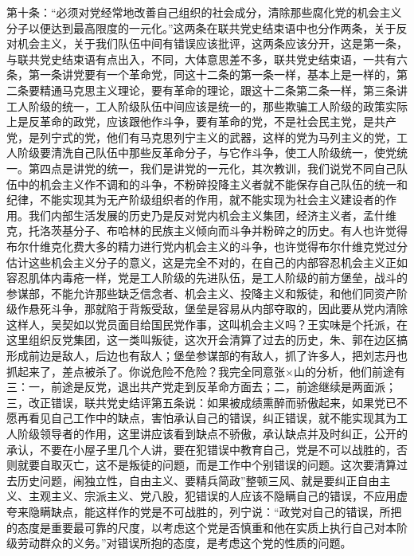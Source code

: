 第十条：“必须对党经常地改善自己组织的社会成分，清除那些腐化党的机会主义分子以便达到最高限度的一元化。”这两条在联共党史结束语中也分作两条，关于反对机会主义，关于我们队伍中间有错误应该批评，这两条应该分开，这是第一条，与联共党史结束语有点出入，不同，大体意思差不多，联共党史结束语，一共有六条，第一条讲党要有一个革命党，同这十二条的第一条一样，基本上是一样的，第二条要精通马克思主义理论，要有革命的理论，跟这十二条第二条一样，第三条讲工人阶级的统一，工人阶级队伍中间应该是统一的，那些欺骗工人阶级的政策实际上是反革命的政党，应该跟他作斗争，要有革命的党，不是社会民主党，是共产党，是列宁式的党，他们有马克思列宁主义的武器，这样的党为马列主义的党，工人阶级要清洗自己队伍中那些反革命分子，与它作斗争，使工人阶级统一，使党统一。第四点是讲党的统一，我们是讲党的一元化，其次教训，我们说党不同自己队伍中的机会主义作不调和的斗争，不粉碎投降主义者就不能保存自己队伍的统一和纪律，不能实现其为无产阶级组织者的作用，就不能实现为社会主义建设者的作用。我们内部生活发展的历史乃是反对党内机会主义集团，经济主义者，孟什维克，托洛茨基分子、布哈林的民族主义倾向而斗争并粉碎之的历史。有人也许觉得布尔什维克化费大多的精力进行党内机会主义的斗争，也许觉得布尔什维克党过分估计这些机会主义分子的意义，这是完全不对的，在自己的内部容忍机会主义正如容忍肌体内毒疮一样，党是工人阶级的先进队伍，是工人阶级的前方堡垒，战斗的参谋部，不能允许那些缺乏信念者、机会主义、投降主义和叛徒，和他们同资产阶级作悬死斗争，那就陷于背叛受敌，堡垒是容易从内部夺取的，因此要从党内清除这样人，吴契如以党员面目给国民党作事，这叫机会主义吗？王实味是个托派，在这里组织反党集团，这一类叫叛徒，这次开会清算了过去的历史，朱、郭在边区搞形成前边是敌人，后边也有敌人；堡垒参谋部的有敌人，抓了许多人，把刘志丹也抓起来了，差点被杀了。你说危险不危险？我完全同意张×山的分析，他们前途有三：一，前途是反党，退出共产党走到反革命方面去；二，前途继续是两面派；三，改正错误，联共党史结评第五条说：如果被成绩熏醉而骄傲起来，如果党已不愿再看见自己工作中的缺点，害怕承认自己的错误，纠正错误，就不能实现其为工人阶级领导者的作用，这里讲应该看到缺点不骄傲，承认缺点并及时纠正，公开的承认，不要在小屋子里几个人讲，要在犯错误中教育自己，党是不可以战胜的，否则就要自取灭亡，这不是叛徒的问题，而是工作中个别错误的问题。这次要清算过去历史问题，闹独立性，自由主义、要精兵简政”整顿三风、就是要纠正自由主义、主观主义、宗派主义、党八股，犯错误的人应该不隐瞒自己的错误，不应用虚夸来隐瞒缺点，能这样作的党是不可战胜的，列宁说：“政党对自己的错误，所把的态度是重要最可靠的尺度，以考虑这个党是否慎重和他在实质上执行自己对本阶级劳动群众的义务。”对错误所抱的态度，是考虑这个党的性质的问题。

